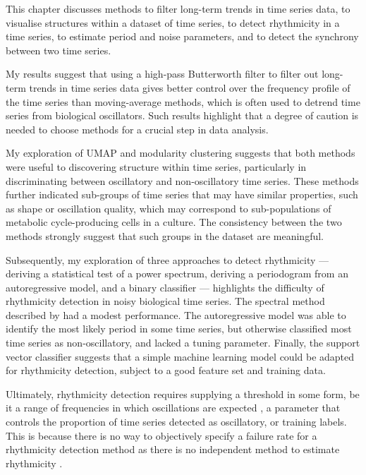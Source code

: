 This chapter discusses methods to filter long-term trends in time series data, to visualise structures within a dataset of time series, to detect rhythmicity in a time series, to estimate period and noise parameters, and to detect the synchrony between two time series.

My results suggest that using a high-pass Butterworth filter to filter out long-term trends in time series data gives better control over the frequency profile of the time series than moving-average methods, which is often used to detrend time series from biological oscillators.
Such results highlight that a degree of caution is needed to choose methods for a crucial step in data analysis.

My exploration of UMAP and modularity clustering suggests that both methods were useful to discovering structure within time series, particularly in discriminating between oscillatory and non-oscillatory time series.
These methods further indicated sub-groups of time series that may have similar properties, such as shape or oscillation quality, which may correspond to sub-populations of metabolic cycle-producing cells in a culture.
The consistency between the two methods strongly suggest that such groups in the dataset are meaningful.

Subsequently, my exploration of three approaches to detect rhythmicity --- deriving a statistical test of a power spectrum, deriving a periodogram from an autoregressive model, and a binary classifier --- highlights the difficulty of rhythmicity detection in noisy biological time series.
The spectral method described by \parencite{glynnDetectingPeriodicPatterns2006a} had a modest performance.
The autoregressive model was able to identify the most likely period in some time series, but otherwise classified most time series as non-oscillatory, and lacked a tuning parameter.
Finally, the support vector classifier suggests that a simple machine learning model could be adapted for rhythmicity detection, subject to a good feature set and training data.

Ultimately, rhythmicity detection requires supplying a threshold in some form, be it a range of frequencies in which oscillations are expected \parencite{zielinskiStrengthsLimitationsPeriod2014}, a parameter that controls the proportion of time series detected as oscillatory, or training labels.
This is because there is no way to objectively specify a failure rate for a rhythmicity detection method as there is no independent method to estimate rhythmicity \parencite{zielinskiStrengthsLimitationsPeriod2014}.

